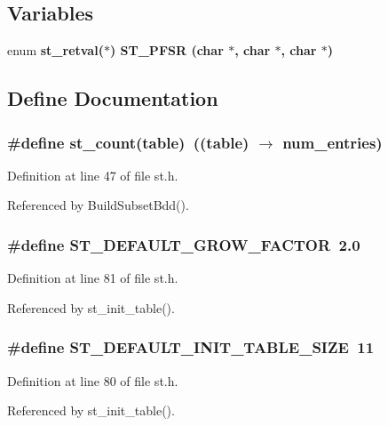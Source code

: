 \subsection*{Variables}
\begin{CompactItemize}
\item 
enum \bf{st\_\-retval}($\ast$) \bf{ST\_\-PFSR} (char $\ast$, char $\ast$, char $\ast$)
\end{CompactItemize}


\subsection{Define Documentation}
\subsubsection{\setlength{\rightskip}{0pt plus 5cm}\#define st\_\-count(table)~((table) $\rightarrow$ num\_\-entries)}\label{st_8h_140c61cab2720a1fa326c92be40c62d8}




Definition at line 47 of file st.h.

Referenced by Build\-Subset\-Bdd().
\subsubsection{\setlength{\rightskip}{0pt plus 5cm}\#define ST\_\-DEFAULT\_\-GROW\_\-FACTOR~2.0}\label{st_8h_05bb01984da349eeeb8eed0ce43c38a5}




Definition at line 81 of file st.h.

Referenced by st\_\-init\_\-table().
\subsubsection{\setlength{\rightskip}{0pt plus 5cm}\#define ST\_\-DEFAULT\_\-INIT\_\-TABLE\_\-SIZE~11}\label{st_8h_311df13f4d458054df7d87ca22782ab2}




Definition at line 80 of file st.h.

Referenced by st\_\-init\_\-table().

